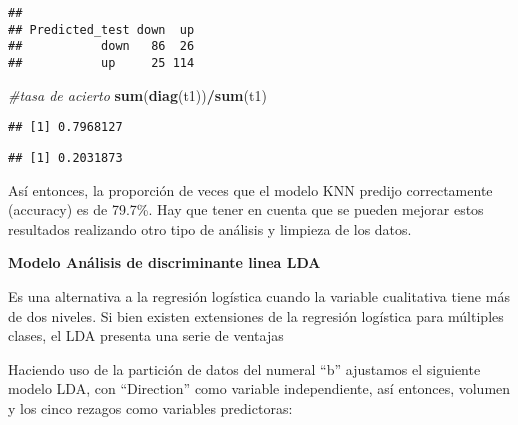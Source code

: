 \documentclass[
]{article}
\newenvironment{Shaded}{\begin{snugshade}}{\end{snugshade}}
\newcommand{\CommentTok}[1]{\textcolor[rgb]{0.56,0.35,0.01}{\textit{#1}}}
\newcommand{\KeywordTok}[1]{\textcolor[rgb]{0.13,0.29,0.53}{\textbf{#1}}}
\newcommand{\NormalTok}[1]{#1}
\newcommand{\OperatorTok}[1]{\textcolor[rgb]{0.81,0.36,0.00}{\textbf{#1}}}
\begin{document}
\begin{Shaded}
\end{Shaded}

\begin{verbatim}
##               
## Predicted_test down  up
##           down   86  26
##           up     25 114
\end{verbatim}

\begin{Shaded}
\begin{Highlighting}[]
\CommentTok{#tasa de acierto}
\KeywordTok{sum}\NormalTok{(}\KeywordTok{diag}\NormalTok{(t1))}\OperatorTok{/}\KeywordTok{sum}\NormalTok{(t1)}
\end{Highlighting}
\end{Shaded}

\begin{verbatim}
## [1] 0.7968127
\end{verbatim}

\begin{Shaded}
\end{Shaded}

\begin{verbatim}
## [1] 0.2031873
\end{verbatim}

Así entonces, la proporción de veces que el modelo KNN predijo
correctamente (accuracy) es de 79.7\%. Hay que tener en cuenta que se
pueden mejorar estos resultados realizando otro tipo de análisis y
limpieza de los datos.

\textbf{Modelo Análisis de discriminante linea LDA}

Es una alternativa a la regresión logística cuando la variable
cualitativa tiene más de dos niveles. Si bien existen extensiones de la
regresión logística para múltiples clases, el LDA presenta una serie de
ventajas

Haciendo uso de la partición de datos del numeral ``b'' ajustamos el
siguiente modelo LDA, con ``Direction'' como variable independiente, así
entonces, volumen y los cinco rezagos como variables predictoras:
\end{document}
